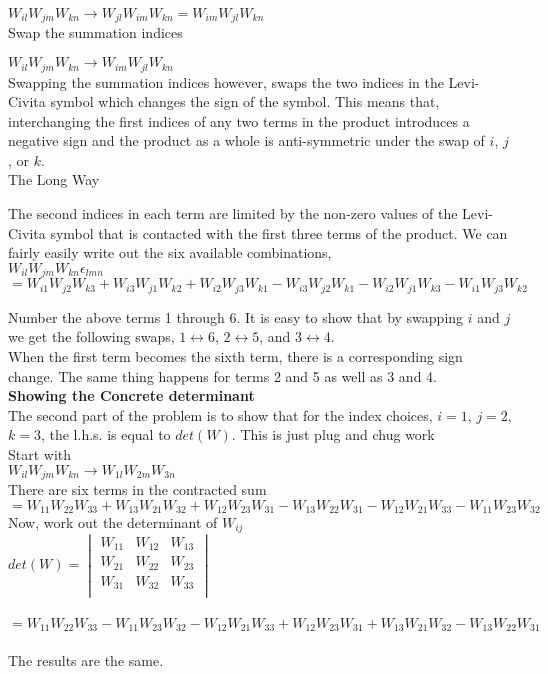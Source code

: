 \documentclass[prb,preprint]
{revtex4-1}
\begin{document}
$W_{il}W_{jm}W_{kn} \rightarrow W_{jl}W_{im}W_{kn} = W_{im}W_{jl}W_{kn}$
\\

Swap the summation indices

$W_{il}W_{jm}W_{kn} \rightarrow W_{im}W_{jl}W_{kn}$
\\

Swapping the summation indices however, swaps the two indices in the Levi-Civita symbol which changes the sign of the symbol.  This means that, interchanging the first indices of any two terms in the product introduces a negative sign and the product as a whole is anti-symmetric under the swap of $i$, $j$, or $k$.
\\

The Long Way

The second indices in each term are limited by the non-zero values of the Levi-Civita symbol that is contacted with the first three terms of the product.  We can fairly easily write out the six available combinations,\\
$W_{il}W_{jm}W_{kn}\epsilon_{lmn}$\\
$= W_{i1}W_{j2}W_{k3} + W_{i3}W_{j1}W_{k2} + W_{i2}W_{j3}W_{k1} - W_{i3}W_{j2}W_{k1} - W_{i2}W_{j1}W_{k3} - W_{i1}W_{j3}W_{k2}$

Number the above terms 1 through 6.  It is easy to show that by swapping $i$ and $j$ we get the following swaps, $1\leftrightarrow 6$,  $2\leftrightarrow 5$, and $3\leftrightarrow 4$.  \\

When the first term becomes the sixth term, there is a corresponding sign change.  The same thing happens for terms 2 and 5 as well as 3 and 4.
\\

{\bf Showing the Concrete determinant}\\

The second part of the problem is to show that for the index choices, $i = 1$, $j = 2$, $k = 3$, the l.h.s. is equal to $det\left(W\right)$.  This is just plug and chug work\\
Start with\\
$W_{il}W_{jm}W_{kn} \rightarrow W_{1l}W_{2m}W_{3n}$\\
There are six terms in the contracted sum\\
$= W_{11}W_{22}W_{33} + W_{13}W_{21}W_{32} + W_{12}W_{23}W_{31} - W_{13}W_{22}W_{31} - W_{12}W_{21}W_{33} - W_{11}W_{23}W_{32}$
\\
Now, work out the determinant of $W_{ij}$
\\
$det\left(W\right) = \begin{vmatrix}
W_{11} & W_{12} & W_{13}\\
W_{21} & W_{22} & W_{23}\\
W_{31} & W_{32} & W_{33}\\
\end{vmatrix}$\\\\
$=W_{11}W_{22}W_{33} - W_{11}W_{23}W_{32} - W_{12}W_{21}W_{33} + W_{12}W_{23}W_{31} + W_{13}W_{21}W_{32} - W_{13}W_{22}W_{31}$\\\\
The results are the same.
\end{document}
